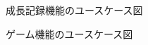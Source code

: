 \documentclass[a4j]{jarticle}
\begin{document}
\begin{figure}[H]
  \begin{center}
    \caption{成長記録機能のユースケース図}
    \label{成長記録}
  \end{center}
\end{figure}

\begin{figure}[H]
  \begin{center}
    \caption{ゲーム機能のユースケース図}
    \label{ゲーム}
  \end{center}
\end{figure}
\end{document}
